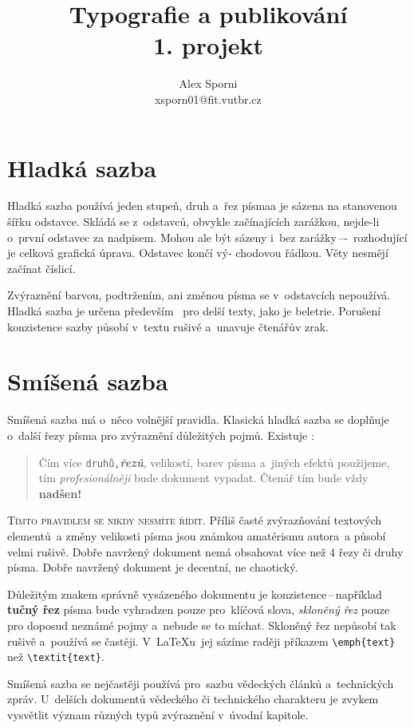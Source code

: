 \documentclass[a4paper, 10 pt, twocolumn]{article}
\date {}
\begin{document}
\title{Typografie a publikování \\ [0.3cm]
\large 1. projekt \\}
\author{Alex Sporni \\
xsporn01@fit.vutbr.cz}




\maketitle

\section{Hladká sazba}
Hladká sazba používá jeden stupeň, druh a~řez písma\linebreak a
je sázena na stanovenou šířku odstavce. Skládá se z~odstavců,
obvykle začínajících zarážkou, nejde-li o~první odstavec
za nadpisem. Mohou ale být sázeny i~bez zarážky\,–-\,
rozhodující je celková grafická úprava. Odstavec končí vý-
chodovou řádkou. Věty nesmějí začínat číslicí.\par
Zvýraznění barvou, podtržením, ani změnou písma se
v~odstavcích nepoužívá. Hladká sazba je určena především
~pro delší texty, jako je beletrie. Porušení konzistence sazby
působí v~textu rušivě a~unavuje čtenářův zrak.

\section{Smíšená sazba} \label{2}
Smíšená sazba má o~něco volnější pravidla. Klasická hladká
sazba se doplňuje o~další řezy písma pro zvýraznění důležitých
pojmů. Existuje :\par
\begin{quotation}
Čím více \texttt{druhů,}{\itshape\bfseries řezů}, velikostí, barev písma
{\selectfont a~jiných efektů} použijeme, tím \textit{profesionálněji}
bude dokument vypadat. Čtenář tím {\tiny bude} vždy
\textbf{{\huge nadšen!}}
\end{quotation}
\par \textsc{Tímto pravidlem se nikdy nesmíte řídit}. Příliš
časté zvýrazňování textových elementů~a změny velikosti
písma jsou známkou amatérismu autora~a působí velmi rušivě.
Dobře navržený dokument nemá obsahovat více než
4 řezy či druhy písma. Dobře navržený dokument je decentní,
ne chaotický.
\par Důležitým znakem správně vysázeného dokumentu je
konzistence\,--\,například \textbf{tučný řez} písma bude vyhradzen
pouze pro~klíčová slova, \textit{skloněný řez} pouze pro doposud
neznámé pojmy a~nebude se to míchat. Skloněný řez nepůsobí
tak rušivě a~používá se častěji. V~\LaTeX\/u~jej sázíme
raději příkazem \verb|\emph{text}| než \verb|\textit{text}|.
\par Smíšená sazba se nejčastěji používá pro~sazbu vědeckých
článků a~technických zpráv. U~delších dokumentů
vědeckého či technického charakteru je zvykem vysvětlit
význam různých typů zvýraznění v~úvodní kapitole.
\end{document}
